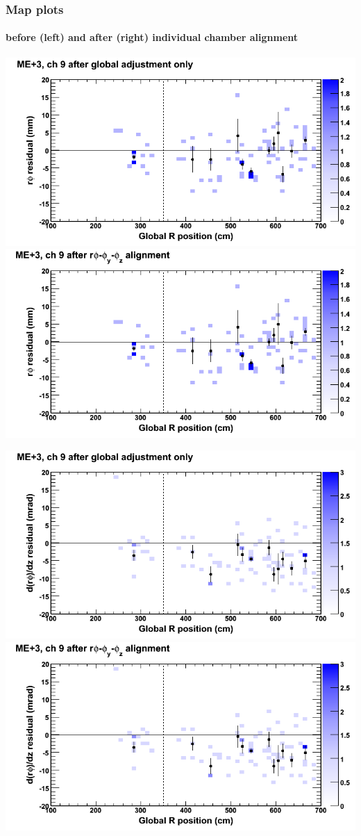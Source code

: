 \documentclass[compress]{beamer}
\begin{document}
\begin{frame}
\frametitle{Map plots}
\framesubtitle{before (left) and after (right) individual chamber alignment}
\includegraphics[width=0.5\linewidth]{ringmapplots_3dof/before_CSCvsr_mep3ch09_x.png} \includegraphics[width=0.5\linewidth]{ringmapplots_3dof/after_CSCvsr_mep3ch09_x.png}

\includegraphics[width=0.5\linewidth]{ringmapplots_3dof/before_CSCvsr_mep3ch09_dxdz.png} \includegraphics[width=0.5\linewidth]{ringmapplots_3dof/after_CSCvsr_mep3ch09_dxdz.png}
\end{frame}
\end{document}
